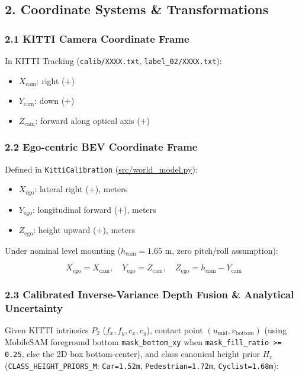 \documentclass[10.5pt,a4paper]{article}
\begin{document}
\subsection{2. Coordinate Systems \& Transformations}

\subsubsection{2.1 KITTI Camera Coordinate Frame}
In KITTI Tracking (\texttt{calib/\allowbreak{}XXXX.\allowbreak{}txt}, \texttt{label\_\allowbreak{}02/\allowbreak{}XXXX.\allowbreak{}txt}):

\begin{itemize}[leftmargin=1.5em,itemsep=2pt]
\item $X_{\text{cam}}$: right ($+$)
\item $Y_{\text{cam}}$: down ($+$)
\item $Z_{\text{cam}}$: forward along optical axis ($+$)
\end{itemize}

\subsubsection{2.2 Ego-centric BEV Coordinate Frame}
Defined in \texttt{KittiCalibration} (\href{https://github.com/Heisnotanimposter/Totalcare\_autonomous\_driving\_Yolov5/blob/main/src/world\_model.py}{src/world\_model.py}):

\begin{itemize}[leftmargin=1.5em,itemsep=2pt]
\item $X_{\text{ego}}$: lateral right ($+$), meters
\item $Y_{\text{ego}}$: longitudinal forward ($+$), meters
\item $Z_{\text{ego}}$: height upward ($+$), meters
\end{itemize}

Under nominal level mounting ($h_{\text{cam}} = 1.65\text{ m}$, zero pitch/roll assumption):

\[X_{\text{ego}} = X_{\text{cam}}, \quad Y_{\text{ego}} = Z_{\text{cam}}, \quad Z_{\text{ego}} = h_{\text{cam}} - Y_{\text{cam}}\]

\subsubsection{2.3 Calibrated Inverse-Variance Depth Fusion \& Analytical Uncertainty}
Given KITTI intrinsics $P_2$ ($f_x, f_y, c_x, c_y$), contact point $(u_{\text{mid}}, v_{\text{bottom}})$ (using MobileSAM foreground bottom \texttt{mask\_\allowbreak{}bottom\_\allowbreak{}xy} when \texttt{mask\_\allowbreak{}fill\_\allowbreak{}ratio >= 0.\allowbreak{}25}, else the 2D box bottom-center), and class canonical height prior $H_c$ (\texttt{CLASS\_\allowbreak{}HEIGHT\_\allowbreak{}PRIORS\_\allowbreak{}M}: \texttt{Car=1.\allowbreak{}52m}, \texttt{Pedestrian=1.\allowbreak{}72m}, \texttt{Cyclist=1.\allowbreak{}68m}):
\end{document}
